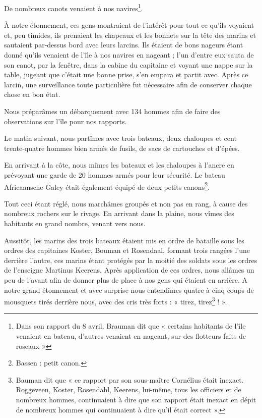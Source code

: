 \documentclass{article}
\begin{document}
        
    De nombreux canots venaient à nos navires\footnote{Dans son rapport du 8 avril, Brauman dit que « certains habitants de l'île venaient en bateau, d'autres venaient en nageant, sur des flotteurs faits de roseaux »}.
            
        
    À notre étonnement, ces gens montraient de l'intérêt pour tout ce qu'ils voyaient et, peu timides, ils prenaient les chapeaux et les bonnets sur la tête des marins et sautaient par-dessus bord avec leurs larcins. Ils étaient de bons nageurs étant donné qu'ils venaient de l'île à nos navires en nageant ; l'un d'entre eux sauta de son canot, par la fenêtre, dans la cabine du capitaine et voyant une nappe sur la table, jugeant que c'était une bonne prise, s'en empara et partit avec. Après ce larcin, une surveillance toute particulière fut nécessaire afin de conserver chaque chose en bon état.
            
        
    Nous préparâmes un débarquement avec 134 hommes afin de faire des observations sur l'île pour nos rapports.
            
        
    Le matin suivant, nous partîmes avec trois bateaux, deux chaloupes et cent trente-quatre hommes bien armés de fusils, de sacs de cartouches et d'épées.
            
        
    En arrivant à la côte, nous mîmes les bateaux et les chaloupes à l'ancre en prévoyant une garde de 20 hommes armés pour leur sécurité. Le bateau Africaansche Galey était également équipé de deux petits canons\footnote{Bassen : petit canon.}.
            
        
    Tout ceci étant réglé, nous marchâmes groupés et non pas en rang, à cause des nombreux rochers sur le rivage. En arrivant dans la plaine, nous vîmes des habitants en grand nombre, venant vers nous.
            
        
    Aussitôt, les marins des trois bateaux étaient mis en ordre de bataille sous les ordres des capitaines Koster, Bouman et Rosendaal, formant trois rangées l'une derrière l'autre, ces marins étant protégés par la moitié des soldats sous les ordres de l'enseigne Martinus Keerens. Après application de ces ordres, nous allâmes un peu de l'avant afin de donner plus de place à nos gens qui étaient en arrière. A notre grand étonnement et avec surprise nous entendîmes quatre à cinq coups de mousquets tirés derrière nous, avec des cris très forts : « tirez, tirez\footnote{Bauman dit que « ce rapport par son sous-maître Cornélius était inexact. Roggeveen, Koster, Rosendahl, Keerens, lui-même, tous les officiers et de nombreux hommes, continuaient à dire que son rapport était inexact en dépit de nombreux hommes qui continuaient à dire qu'il était correct ».} ! ».
            
\end{document}
